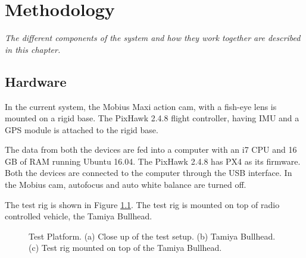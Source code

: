\setlength{\footskip}{8mm}

\chapter{Methodology}
\label{ch:methodology}

\textit{The different components of the system and how they work together are described in this chapter.}

\section{Hardware}

In the current system, the Mobius Maxi action cam, with a fish-eye lens is mounted on a rigid base. The PixHawk 2.4.8 flight controller, having IMU and a GPS module is attached to the rigid base. 


The data from both the devices are fed into a computer with an i7 CPU and 16 GB of RAM running Ubuntu 16.04. The PixHawk 2.4.8 has PX4 as its firmware. Both the devices are connected to the computer through the USB interface. In the Mobius cam, autofocus and auto white balance are turned off. 

The test rig is shown in Figure \ref{fig:rigsetup}. The test rig is mounted on top of radio controlled vehicle, the Tamiya Bullhead. 

\begin{figure}[htp]
	
	\centering
	\caption[Test platform.]{\small 
		Test Platform. (a) Close up of the test setup. (b) Tamiya Bullhead. (c) Test rig mounted on top of the Tamiya Bullhead.}
	\label{fig:rigsetup}
	
\end{figure}


